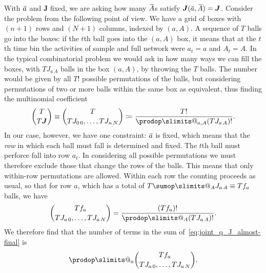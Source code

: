 \documentclass[\ifafour a4paper,12pt,\else a5paper,10pt,\fi%
onecolumn,oneside,article,%
british%
]{memoir}
\makeatletter
\theoremstyle{remark}
\theoremstyle{innote}
\def\sum{\DOTSI\sumop\slimits@}
\def\prod{\DOTSI\prodop\slimits@}
\newcommand*{\defd}{\coloneqq}
\renewcommand*{\|}[1][]{\nonscript\,#1\vert\nonscript\;\mathopen{}}
\newcommand*{\widebar}[1]{{\mkern1.5mu\skew{2}\overline{\mkern-1.5mu#1\mkern-1.5mu}\mkern 1.5mu}}
\newcommand*{\yAs}{\widebar{A}}%
\newcommand*{\yas}{\widebar{a}}%
\newcommand*{\yJJ}{J}
\newcommand*{\yJ}{\bm{\yJJ}}
\makeatother
\begin{document}
With $\yas$ and $\yJ$ fixed, we are asking how many $\yAs$s satisfy
$\yJ(\yas, \yAs)=\yJ$. Consider the problem from the following point of
view. We have a grid of boxes with $(n+1)$ rows and $(N+1)$ columns,
indexed by $(a,A)$. A sequence of $T$ balls go into the boxes: if the $t$th
ball goes into the $(a,A)$ box, it means that at the $t$th time bin the
activities of sample and full network were $a_{t}=a$ and $A_{t}=A$. In the
typical combinatorial problem we would ask in how many ways we can fill the
boxes, with $T J_{a\,A}$ balls in the box $(a,A)$, by throwing the $T$
balls. The number would be given by all $T!$ possible permutations of the
balls, but considering permutations of two or more balls within the same
box as equivalent, thus finding the multinomial coefficient
\begin{equation}
  \label{eq:multinomial_coefficient_generic}
  \binom{T}{T\yJ} \equiv
  \binom{T}{T J_{0\,0}, \dotsc, T J_{n\,N}} 
  \defd
  \frac{T!}{\prod_{a,A}(T J_{a\,A})!}.
\end{equation}
In our case, however, we have one constraint: $\yas$ is fixed, which means
that the \emph{row} in which each ball must fall is determined and fixed.
The $t$th ball must perforce fall into row $a_{t}$. In considering all
possible permutations we must therefore exclude those that change the rows
of the balls. This means that only within-row permutations are allowed.
Within each row the counting proceeds as usual, so that for row $a$, which
has a total of $T\sum_{A}J_{a\,A}\equiv T f_{a}$ balls, we have
\begin{equation}
  \label{eq:multinomial_coefficient_row}
  \binom{T f_{a}}{T J_{a\,0}, \dotsc, T J_{a\,N}} =
  \frac{(T f_{a})!}{\prod_{A}(T J_{a\,A})!}.
\end{equation}
We therefore find that the number of terms in the sum
of~\eqref{eq:joint_q_J_almost-final} is
\begin{equation}
  \label{eq:multinomial_coefficient_withinrow}
  \prod_{a}\binom{T f_{a}}{T J_{a\,0}, \dotsc, T J_{a\,N}}.
\end{equation}
\end{document}
